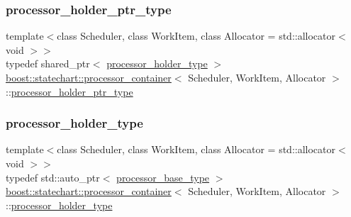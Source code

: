 \mbox{\label{classboost_1_1statechart_1_1processor__container_a885e5a42694857bfaa44ec053ed20a57}} 
\subsubsection{\texorpdfstring{processor\+\_\+holder\+\_\+ptr\+\_\+type}{processor\_holder\_ptr\_type}}
{\footnotesize\ttfamily template$<$class Scheduler, class Work\+Item, class Allocator = std\+::allocator$<$ void $>$$>$ \\
typedef shared\+\_\+ptr$<$ \mbox{\hyperlink{classboost_1_1statechart_1_1processor__container_a3e774bbec52b2b0b9f0dfcde42f33b49}{processor\+\_\+holder\+\_\+type}} $>$ \mbox{\hyperlink{classboost_1_1statechart_1_1processor__container}{boost\+::statechart\+::processor\+\_\+container}}$<$ Scheduler, Work\+Item, Allocator $>$\+::\mbox{\hyperlink{classboost_1_1statechart_1_1processor__container_a885e5a42694857bfaa44ec053ed20a57}{processor\+\_\+holder\+\_\+ptr\+\_\+type}}\hspace{0.3cm}{\ttfamily [private]}}

\mbox{\label{classboost_1_1statechart_1_1processor__container_a3e774bbec52b2b0b9f0dfcde42f33b49}} 
\subsubsection{\texorpdfstring{processor\+\_\+holder\+\_\+type}{processor\_holder\_type}}
{\footnotesize\ttfamily template$<$class Scheduler, class Work\+Item, class Allocator = std\+::allocator$<$ void $>$$>$ \\
typedef std\+::auto\+\_\+ptr$<$ \mbox{\hyperlink{classboost_1_1statechart_1_1processor__container_a9d1537cda77f083b3a65a67d8ffd1f2a}{processor\+\_\+base\+\_\+type}} $>$ \mbox{\hyperlink{classboost_1_1statechart_1_1processor__container}{boost\+::statechart\+::processor\+\_\+container}}$<$ Scheduler, Work\+Item, Allocator $>$\+::\mbox{\hyperlink{classboost_1_1statechart_1_1processor__container_a3e774bbec52b2b0b9f0dfcde42f33b49}{processor\+\_\+holder\+\_\+type}}\hspace{0.3cm}{\ttfamily [private]}}



